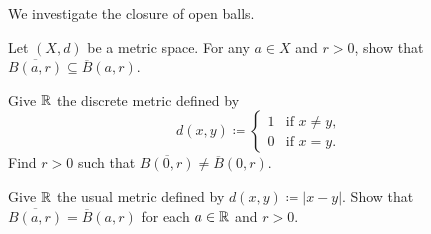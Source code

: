 \documentclass[../main.tex]{subfiles}
\begin{document}
\begin{homework}
    We investigate the closure of open balls.
    \begin{listalph}
        \item Let $(X,d)$ be a metric space. For any $a\in X$ and $r>0$, show that $\overline{B(a,r)}\subseteq\overline B(a,r)$.
        \item Give $\mathbb R$ the discrete metric defined by
        \[d(x,y)\coloneqq\begin{cases}
            1 & \text{if }x\ne y, \\
            0 & \text{if }x=y.
        \end{cases}\]
        Find $r>0$ such that $\overline{B(0,r)}\ne\overline B(0,r)$.
        \item Give $\mathbb R$ the usual metric defined by $d(x,y)\coloneqq|x-y|$. Show that $\overline{B(a,r)}=\overline B(a,r)$ for each $a\in\mathbb R$ and $r>0$.
    \end{listalph}
\end{homework}
\end{document}
